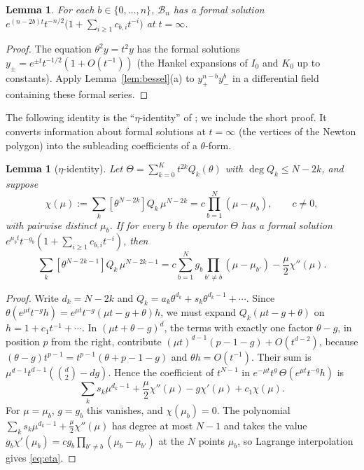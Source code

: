\documentclass[11pt]{amsart}
\newtheorem{lemma}[thm]{Lemma}
\theoremstyle{definition}
\newcommand{\cB}{\mathcal B}
\begin{document}
\begin{lemma}\label{lem:formal}
For each $b\in\{0,\dots,n\}$, $\cB_n$ has a formal solution $e^{(n-2b)t}t^{-n/2}\bigl(1+\sum_{i\ge1}c_{b,i}t^{-i}\bigr)$ at $t=\infty$.
\end{lemma}

\begin{proof}
The equation $\theta^2y=t^2y$ has the formal solutions $y_\pm=e^{\pm t}t^{-1/2}(1+O(t^{-1}))$ (the Hankel expansions of $I_0$ and $K_0$ up to constants). Apply Lemma~\ref{lem:bessel}(a) to $y_+^{n-b}y_-^b$ in a differential field containing these formal series.
\end{proof}

The following identity is the ``$\eta$-identity'' of \cite[Lemma~2.7]{KVB}; we include the short proof. It converts information about formal solutions at $t=\infty$ (the vertices of the Newton polygon) into the subleading coefficients of a $\theta$-form.

\begin{lemma}[$\eta$-identity]\label{lem:eta}
Let $\Theta=\sum_{k=0}^{K}t^{2k}Q_k(\theta)$ with $\deg Q_k\le N-2k$, and suppose
\[
\chi(\mu):=\sum_k[\theta^{N-2k}]Q_k\,\mu^{N-2k}=c\prod_{b=1}^N(\mu-\mu_b),\qquad c\ne0,
\]
with pairwise distinct $\mu_b$. If for every $b$ the operator $\Theta$ has a formal solution $e^{\mu_bt}t^{-g_b}(1+\sum_{i\ge1}c_{b,i}t^{-i})$, then
\begin{equation}\label{eq:eta}
\sum_k[\theta^{N-2k-1}]Q_k\,\mu^{N-2k-1}=c\sum_{b=1}^Ng_b\prod_{b'\ne b}(\mu-\mu_{b'})-\frac\mu2\chi''(\mu).
\end{equation}
\end{lemma}

\begin{proof}
Write $d_k=N-2k$ and $Q_k=a_k\theta^{d_k}+s_k\theta^{d_k-1}+\cdots$. Since $\theta(e^{\mu t}t^{-g}h)=e^{\mu t}t^{-g}(\mu t-g+\theta)h$, we must expand $Q_k(\mu t-g+\theta)$ on $h=1+c_1t^{-1}+\cdots$. In $(\mu t+\theta-g)^{d}$, the terms with exactly one factor $\theta-g$, in position $p$ from the right, contribute $(\mu t)^{d-1}(p-1-g)+O(t^{d-2})$, because $(\theta-g)t^{p-1}=t^{p-1}(\theta+p-1-g)$ and $\theta h=O(t^{-1})$. Their sum is $\mu^{d-1}t^{d-1}(\binom d2-dg)$. Hence the coefficient of $t^{N-1}$ in $e^{-\mu t}t^g\,\Theta(e^{\mu t}t^{-g}h)$ is
\[
\sum_ks_k\mu^{d_k-1}+\frac\mu2\chi''(\mu)-g\chi'(\mu)+c_1\chi(\mu).
\]
For $\mu=\mu_b$, $g=g_b$ this vanishes, and $\chi(\mu_b)=0$. The polynomial $\sum_ks_k\mu^{d_k-1}+\frac\mu2\chi''(\mu)$ has degree at most $N-1$ and takes the value $g_b\chi'(\mu_b)=cg_b\prod_{b'\ne b}(\mu_b-\mu_{b'})$ at the $N$ points $\mu_b$, so Lagrange interpolation gives \eqref{eq:eta}.
\end{proof}
\end{document}
